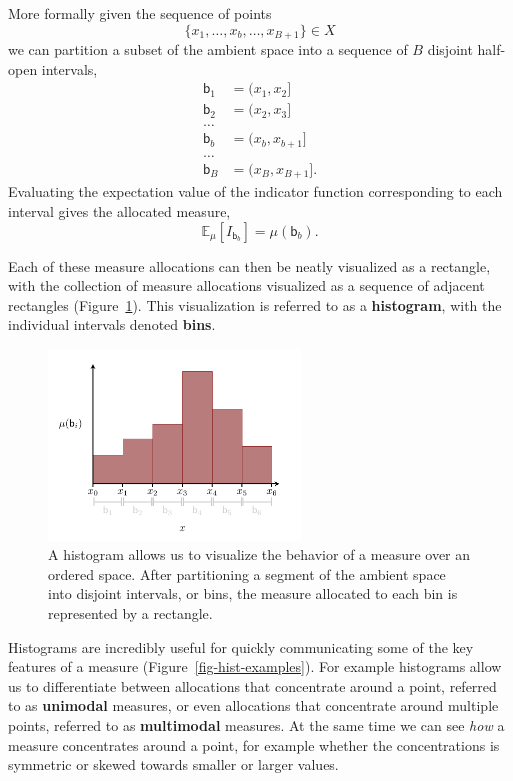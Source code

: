 \documentclass[
  letterpaper,
  DIV=11,
  numbers=noendperiod]{scrartcl}
\begin{document}
More formally given the sequence of points \[
\{ x_{1}, \ldots, x_{b}, \ldots, x_{B + 1} \} \in X
\] we can partition a subset of the ambient space into a sequence of
\(B\) disjoint half-open intervals, \begin{align*}
\mathsf{b}_{1} &= ( x_{1}, x_{2} ]
\\
\mathsf{b}_{2} &= ( x_{2}, x_{3} ]
\\
\ldots&
\\
\mathsf{b}_{b} &= ( x_{b}, x_{b + 1} ]
\\
\ldots&
\\
\mathsf{b}_{B} &= ( x_{B}, x_{B + 1} ].
\end{align*} Evaluating the expectation value of the indicator function
corresponding to each interval gives the allocated measure, \[
\mathbb{E}_{\mu}[I_{\mathsf{b}_{b}}]
= \mu(\mathsf{b}_{b}).
\]

Each of these measure allocations can then be neatly visualized as a
rectangle, with the collection of measure allocations visualized as a
sequence of adjacent rectangles (Figure~\ref{fig-histogram-basics}).
This visualization is referred to as a \textbf{histogram}, with the
individual intervals denoted \textbf{bins}.

\begin{figure}

{\centering \includegraphics[width=0.6\textwidth,height=\textheight]{figures/histograms/histogram/histogram.pdf}

}

\caption{\label{fig-histogram-basics}A histogram allows us to visualize
the behavior of a measure over an ordered space. After partitioning a
segment of the ambient space into disjoint intervals, or bins, the
measure allocated to each bin is represented by a rectangle.}

\end{figure}

Histograms are incredibly useful for quickly communicating some of the
key features of a measure (Figure~\ref{fig-hist-examples}). For example
histograms allow us to differentiate between allocations that
concentrate around a point, referred to as \textbf{unimodal} measures,
or even allocations that concentrate around multiple points, referred to
as \textbf{multimodal} measures. At the same time we can see \emph{how}
a measure concentrates around a point, for example whether the
concentrations is symmetric or skewed towards smaller or larger values.
\end{document}
